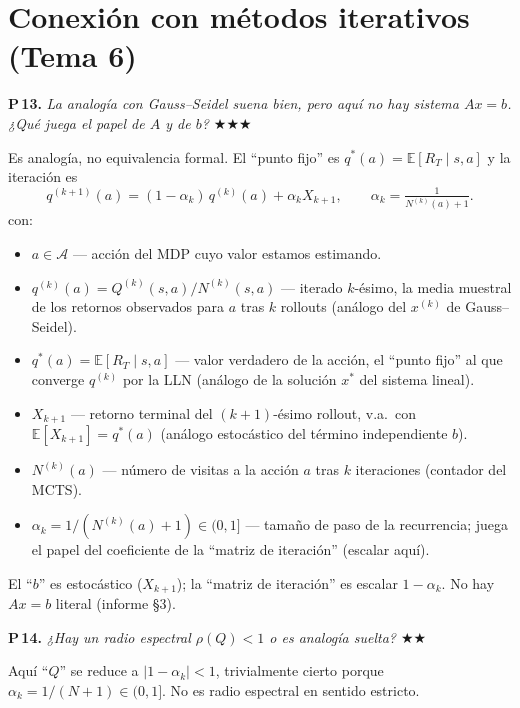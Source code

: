 \documentclass[11pt,a4paper]{article}
\newcommand{\preg}[2]{%
  \par\medskip
  \noindent\textbf{P\,#1.} \emph{#2}\par\smallskip}
\newcommand{\resp}[1]{%
  \noindent #1\par}
\begin{document}
\section{Conexión con métodos iterativos (Tema 6)}

\preg{13}{La analogía con Gauss--Seidel suena bien, pero aquí no hay sistema
$Ax=b$. ¿Qué juega el papel de $A$ y de $b$?
\hfill$\bigstar\bigstar\bigstar$}
\resp{%
Es analogía, no equivalencia formal. El ``punto fijo'' es
$q^*(a)=\mathbb{E}[R_T\mid s,a]$ y la iteración es
\[
  q^{(k+1)}(a) = (1-\alpha_k)\,q^{(k)}(a) + \alpha_k X_{k+1},
  \qquad \alpha_k = \tfrac{1}{N^{(k)}(a)+1}.
\]
con:
\begin{itemize}\setlength{\itemsep}{0pt}
  \item $a\in\mathcal{A}$ --- acción del MDP cuyo valor estamos estimando.
  \item $q^{(k)}(a)=Q^{(k)}(s,a)/N^{(k)}(s,a)$ --- iterado $k$-ésimo, la
        media muestral de los retornos observados para $a$ tras $k$
        rollouts (análogo del $x^{(k)}$ de Gauss--Seidel).
  \item $q^*(a)=\mathbb{E}[R_T\mid s,a]$ --- valor verdadero de la acción,
        el ``punto fijo'' al que converge $q^{(k)}$ por la LLN
        (análogo de la solución $x^*$ del sistema lineal).
  \item $X_{k+1}$ --- retorno terminal del $(k{+}1)$-ésimo rollout,
        v.a.\ con $\mathbb{E}[X_{k+1}]=q^*(a)$ (análogo estocástico del
        término independiente $b$).
  \item $N^{(k)}(a)$ --- número de visitas a la acción $a$ tras $k$
        iteraciones (contador del MCTS).
  \item $\alpha_k=1/(N^{(k)}(a)+1)\in(0,1]$ --- tamaño de paso de la
        recurrencia; juega el papel del coeficiente de la ``matriz de
        iteración'' (escalar aquí).
\end{itemize}
El ``$b$'' es estocástico ($X_{k+1}$); la ``matriz de iteración'' es escalar
$1-\alpha_k$. No hay $Ax=b$ literal (informe \S3).}

\preg{14}{¿Hay un radio espectral $\rho(Q)<1$ o es analogía suelta?
\hfill$\bigstar\bigstar$}
\resp{%
Aquí ``$Q$'' se reduce a $|1-\alpha_k|<1$, trivialmente cierto porque
$\alpha_k=1/(N+1)\in(0,1]$. No es radio espectral en sentido estricto.}
\end{document}
